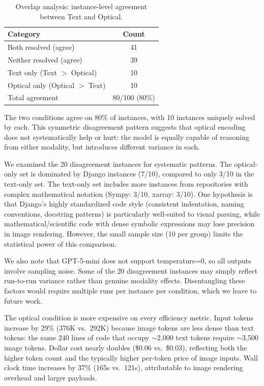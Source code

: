 \begin{table}[t]
\centering
\caption{Overlap analysis: instance-level agreement between Text and Optical.}
\label{tab:overlap}
\small
\begin{tabular}{lc}
\toprule
\textbf{Category} & \textbf{Count} \\
\midrule
Both resolved (agree)        & 41 \\
Neither resolved (agree)     & 39 \\
Text only (Text $>$ Optical) & 10 \\
Optical only (Optical $>$ Text) & 10 \\
\midrule
Total agreement              & 80/100 (80\%) \\
\bottomrule
\end{tabular}
\end{table}

The two conditions agree on 80\% of instances, with 10 instances uniquely solved by each. This symmetric disagreement pattern suggests that optical encoding does not systematically help or hurt: the model is equally capable of reasoning from either modality, but introduces different variance in each.

We examined the 20 disagreement instances for systematic patterns. The optical-only set is dominated by Django instances (7/10), compared to only 3/10 in the text-only set. The text-only set includes more instances from repositories with complex mathematical notation (Sympy: 3/10, xarray: 3/10). One hypothesis is that Django's highly standardized code style (consistent indentation, naming conventions, docstring patterns) is particularly well-suited to visual parsing, while mathematical/scientific code with dense symbolic expressions may lose precision in image rendering. However, the small sample size (10 per group) limits the statistical power of this comparison.

We also note that GPT-5-mini does not support temperature=0, so all outputs involve sampling noise. Some of the 20 disagreement instances may simply reflect run-to-run variance rather than genuine modality effects. Disentangling these factors would require multiple runs per instance per condition, which we leave to future work.

The optical condition is more expensive on every efficiency metric. Input tokens increase by 29\% (376K vs.\ 292K) because image tokens are less dense than text tokens: the same 240 lines of code that occupy $\sim$2{,}000 text tokens require $\sim$3{,}500 image tokens. Dollar cost nearly doubles (\$0.06 vs.\ \$0.03), reflecting both the higher token count and the typically higher per-token price of image inputs. Wall clock time increases by 37\% (165s vs.\ 121s), attributable to image rendering overhead and larger payloads.

